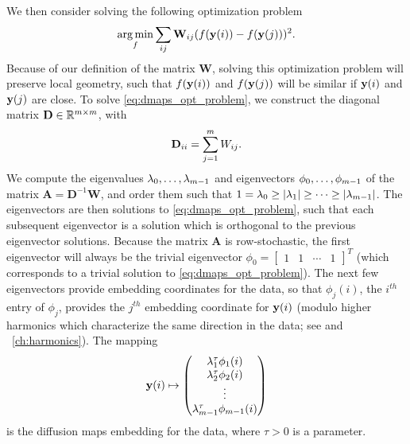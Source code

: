 We then consider solving the following optimization problem \citep{Belkin2003}
\begin{equation} \label{eq:dmaps_opt_problem}
\operatorname*{arg\,min}_{f} \sum_{ij} \mathbf{W}_{ij} (f(\mathbf{y}(i)) - f(\mathbf{y}(j)))^2.
\end{equation}
%
Because of our definition of the matrix $\mathbf{W}$, solving this optimization problem will preserve local geometry, such that $f(\mathbf{y}(i))$ and $f(\mathbf{y}(j))$ will be similar if $\mathbf{y}(i)$ and $\mathbf{y}(j)$ are close. 
%
To solve \eqref{eq:dmaps_opt_problem}, we construct the diagonal matrix $\mathbf{D} \in \mathbb{R}^{m \times m}$, with
\begin{equation}
\mathbf{D}_{ii} = \sum_{j=1}^m W_{ij}.
\end{equation}
%
We compute the eigenvalues $\lambda_0, \dots, \lambda_{m-1}$ and eigenvectors $\phi_0, \dots, \phi_{m-1}$ of the matrix $\mathbf{A} = \mathbf{D}^{-1}\mathbf{W}$, and order them such that $1 = \lambda_0 \ge |\lambda_1| \ge \dots \ge |\lambda_{m-1}|$.
%
The eigenvectors are then solutions to \eqref{eq:dmaps_opt_problem}, such that each subsequent eigenvector is a solution which is orthogonal to the previous eigenvector solutions. 
%
Because the matrix $\mathbf{A}$ is row-stochastic, the first eigenvector will always be the trivial eigenvector $\phi_0 = \begin{bmatrix} 1 & 1 & \cdots & 1 \end{bmatrix}^T$ (which corresponds to a trivial solution to \eqref{eq:dmaps_opt_problem}).
%
The next few eigenvectors provide embedding coordinates for the data, so that $\phi_j(i)$, the $i^{th}$ entry of $\phi_j$, provides the $j^{th}$ embedding coordinate for $\mathbf{y}(i)$ (modulo higher harmonics which characterize
the same direction in the data; see \cite{ferguson2010systematic} and \chap~\ref{ch:harmonics}).
%
The mapping
\begin{equation} \label{eq:dmaps_embed_full}
\mathbf{y}(i) \mapsto 
\begin{pmatrix}
\lambda_1^\tau \phi_1(i) \\
\lambda_2^\tau \phi_2(i) \\
\vdots \\
\lambda_{m-1}^\tau  \phi_{m-1}(i)
\end{pmatrix}
\end{equation}
is the diffusion maps embedding for the data, where $\tau > 0$ is a parameter.
